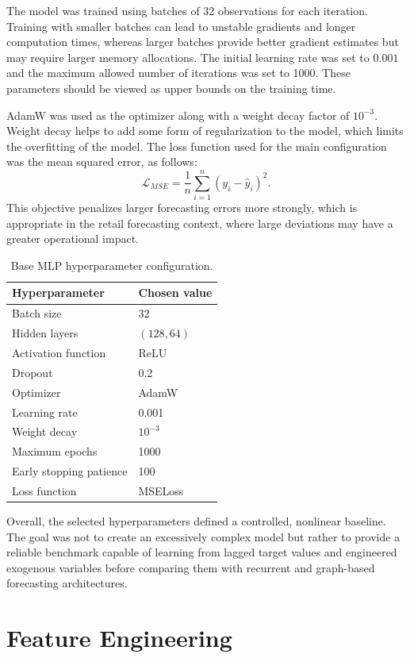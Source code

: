 The model was trained using batches of 32 observations for each iteration. Training with smaller batches can lead to unstable gradients and longer computation times, whereas larger batches provide better gradient estimates but may require larger memory allocations. The initial learning rate was set to \(0.001\) and the maximum allowed number of iterations was set to 1000. These parameters should be viewed as upper bounds on the training time.

AdamW was used as the optimizer along with a weight decay factor of \(10^{-3}\). Weight decay helps to add some form of regularization to the model, which limits the overfitting of the model.
The loss function used for the main configuration was the mean squared error, as follows:
\[
    \mathcal{L}_{MSE} =
    \frac{1}{n}\sum_{i=1}^{n}(y_i - \hat{y}_i)^2.
\]
This objective penalizes larger forecasting errors more strongly, which is appropriate in the retail forecasting context, where large deviations may have a greater operational impact.


\begin{table}[H]
\centering
\caption{Base MLP hyperparameter configuration.}
\label{tab:mlp_hyperparameters}
\begin{tabular}{ll}
\hline
\textbf{Hyperparameter} & \textbf{Chosen value} \\
\hline
Batch size & 32 \\
Hidden layers & $(128, 64)$ \\
Activation function & ReLU \\
Dropout & 0.2 \\
Optimizer & AdamW \\
Learning rate & 0.001 \\
Weight decay & $10^{-3}$ \\
Maximum epochs & 1000 \\
Early stopping patience & 100 \\
Loss function & MSELoss \\
\hline
\end{tabular}
\end{table}

Overall, the selected hyperparameters defined a controlled, nonlinear baseline. The goal was not to create an excessively complex model but rather to provide a reliable benchmark capable of learning from lagged target values and engineered exogenous variables before comparing them with recurrent and graph-based forecasting architectures.
\section{Feature Engineering}

